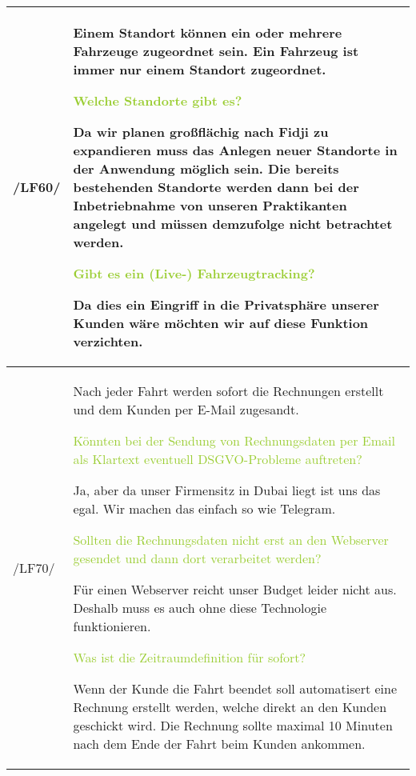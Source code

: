 \begin{tabular}[ht] {l | p{13cm}}
    \hline
    /LF60/ & Einem Standort können ein oder mehrere Fahrzeuge zugeordnet sein. Ein Fahrzeug ist immer nur einem Standort zugeordnet. 
    
    \textcolor{YellowGreen}{Welche Standorte gibt es?}

    \textcolor{NavyBlue}{Da wir planen großflächig nach Fidji zu expandieren muss das Anlegen neuer Standorte in der Anwendung möglich sein. Die bereits bestehenden Standorte werden dann bei der Inbetriebnahme von unseren Praktikanten angelegt und müssen demzufolge nicht betrachtet werden.}
    
    \textcolor{YellowGreen}{Gibt es ein (Live-) Fahrzeugtracking?}
    
    \textcolor{NavyBlue}{Da dies ein Eingriff in die Privatsphäre unserer Kunden wäre möchten wir auf diese Funktion verzichten.}
    \\
    \hline
    /LF70/ & Nach jeder Fahrt werden sofort die Rechnungen erstellt und dem Kunden per  
    E-Mail zugesandt. 

    \textcolor{YellowGreen}{Könnten bei der Sendung von Rechnungsdaten per Email als Klartext eventuell DSGVO-Probleme auftreten?}

    \textcolor{NavyBlue}{Ja, aber da unser Firmensitz in Dubai liegt ist uns das egal. Wir machen das einfach so wie Telegram.}

    \textcolor{YellowGreen}{Sollten die Rechnungsdaten nicht erst an den Webserver gesendet und dann dort verarbeitet werden?}

    \textcolor{NavyBlue}{Für einen Webserver reicht unser Budget leider nicht aus. Deshalb muss es auch ohne diese Technologie funktionieren.}

    \textcolor{YellowGreen}{Was ist die Zeitraumdefinition für \grqq{}sofort\grqq{}?}

    \textcolor{NavyBlue}{Wenn der Kunde die Fahrt beendet soll automatisert eine Rechnung erstellt werden, welche direkt an den Kunden geschickt wird. Die Rechnung sollte maximal 10 Minuten nach dem Ende der Fahrt beim Kunden ankommen.}
    \\
    \hline
\end{tabular}

